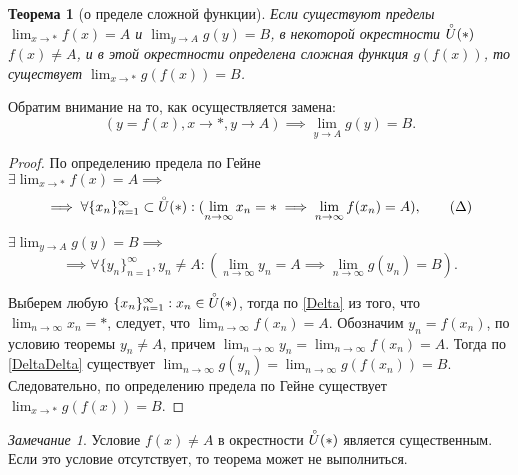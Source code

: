 \documentclass[a4paper,12pt]{article} %
\newtheorem{theorem}{Теорема}[section]
\theoremstyle{remark}
\newtheorem{remark}{Замечание}[theorem]
\theoremstyle{definition}
\begin{document}
\begin{theorem}[о пределе сложной функции]
	Если существуют пределы $\displaystyle \lim_{x \to *} f(x) = A$ и $\displaystyle \lim_{y \to A} g(y) = B$,
    в некоторой окрестности $\accentset{\circ}{U}(*)$ $f(x)\neq A$, и в этой окрестности определена сложная функция $g(f(x))$,
    то существует $\lim_{x \to *} g(f(x)) = B$.
\end{theorem}
Обратим внимание на то, как осуществляется замена:
\[
	(y=f(x), x\to *, y \to A) \implies \lim_{y \to A} g(y) = B
.\] 
\begin{proof}
	По определению предела по Гейне \\
	
	$\displaystyle \exists \lim_{x \to *} f(x) = A \implies $
	\begin{equation}\label{Delta}
			\implies \forall \{x_n\}_{n=1}^{\infty} \subset \accentset{\circ}{U}(*) : (\lim_{n \to \infty} x_n = * \implies \lim_{n \to \infty} f(x_n) = A), \tag{$\Delta$} 
	\end{equation}

	$\displaystyle \exists \lim_{y \to A} g(y) = B \implies$
	\begin{equation}\label{DeltaDelta}
			 \implies \forall \{y_n\}_{n=1}^{\infty}, y_{n}\neq A : (\lim_{n \to \infty} y_n = A \implies \lim_{n \to \infty} g(y_{n}) = B). \tag{$\Delta\Delta$} 
	\end{equation}

	Выберем любую $\{x_n\}_{n=1}^{\infty} : x_{n} \in  \accentset{\circ}{U}(*)$, тогда по \eqref{Delta} из того, 
    что $\lim_{n \to \infty} x_n = *$, следует, что $\lim_{n \to \infty} f(x_{n}) = A$. 
    Обозначим $y_{n}=f(x_{n})$, по условию теоремы $y_{n}\neq A$, причем 
    $\lim_{n \to \infty} y_{n} = \lim_{n \to \infty} f(x_{n}) = A$. 
    Тогда по \eqref{DeltaDelta} существует $\lim_{n \to \infty} g(y_{n}) = \lim_{n \to \infty} g(f(x_{n})) = B$.
    Следовательно, по определению предела по Гейне существует $\lim_{x \to *} g(f(x)) = B$.
\end{proof}
\begin{remark}
	Условие $f(x)\neq A$ в окрестности $\accentset{\circ}{U}(*)$ является существенным.
    Если это условие отсутствует, то теорема может не выполниться.
\end{remark}
\end{document}
